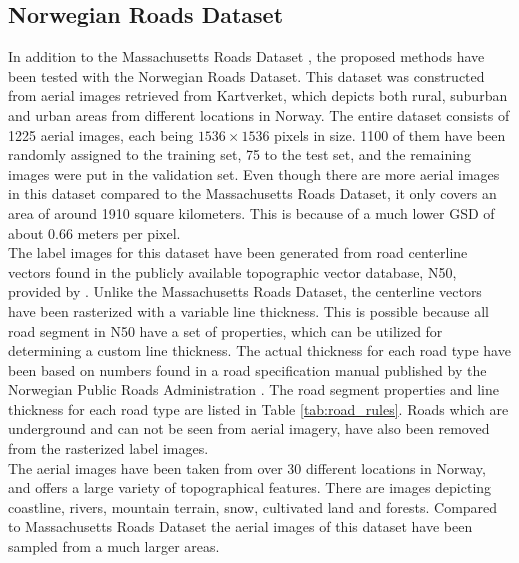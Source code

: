 
\subsection{Norwegian Roads Dataset}
In addition to the Massachusetts Roads Dataset \citep{MnihThesis}, the proposed methods have been tested with the Norwegian Roads Dataset. This dataset was constructed from aerial images retrieved from Kartverket, which depicts both rural, suburban and urban areas from different locations in Norway. The entire dataset consists of 1225 aerial images, each being $1536\times 1536$ pixels in size. 1100 of them have been randomly assigned to the training set, 75 to the test set, and the remaining images were put in the validation set. Even though there are more aerial images in this dataset compared to the Massachusetts Roads Dataset, it only covers an area of around 1910 square kilometers. This is because of a much lower \ac{GSD} of about 0.66 meters per pixel. \\


The label images for this dataset have been generated from road centerline vectors found in the publicly available topographic vector database, N50, provided by \cite{Kartverket}. Unlike the Massachusetts Roads Dataset, the centerline vectors have been rasterized with a variable line thickness. This is possible because all road segment in N50 have a set of properties, which can be utilized for determining a custom line thickness. The actual thickness for each road type have been based on numbers found in a road specification manual published by the Norwegian Public Roads Administration \citep{Norwegian_road_manual}. The road segment properties and line thickness for each road type are listed in Table \ref{tab:road_rules}. Roads which are underground and can not be seen from aerial imagery, have also been removed from the rasterized label images.\\

The aerial images have been taken from over 30 different locations in Norway, and offers a large variety of topographical features. There are images depicting coastline, rivers, mountain terrain, snow, cultivated land and forests. Compared to Massachusetts Roads Dataset the aerial images of this dataset have been sampled from a much larger areas. \\

